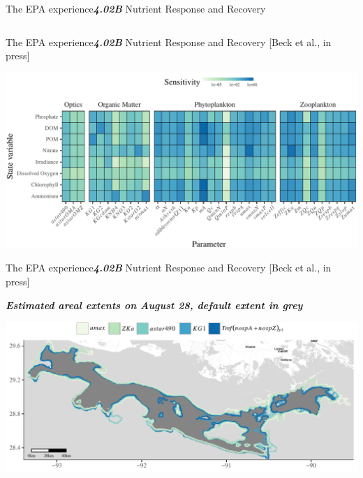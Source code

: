 \documentclass[serif]{beamer}\usepackage[]{graphicx}\usepackage[]{color}
\newcommand{\emtxt}[1]{\textbf{\textit{#1}}}
\begin{document}
\begin{frame}{The EPA experience}{\emtxt{4.02B} Nutrient Response and Recovery}
\begin{columns}
\begin{column}{0.5\textwidth}
\end{column}
\end{columns}
\end{frame}



\begin{frame}{The EPA experience}{\emtxt{4.02B} Nutrient Response and Recovery {\footnotesize [Beck et al., in press]}}
\centerline{\includegraphics[width=\textwidth]{fig/senstile.pdf}}
\end{frame}



\begin{frame}{The EPA experience}{\emtxt{4.02B} Nutrient Response and Recovery {\footnotesize [Beck et al., in press]}}
\centerline{\emtxt{Estimated areal extents on August 28, default extent in grey}}
\vspace{0.15in}
\centerline{\includegraphics[width=\textwidth]{fig/areachg2.pdf}}
\end{frame}
\end{document}
